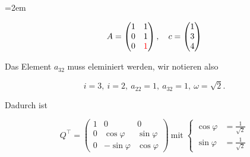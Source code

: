 \begin{solution}    

    \vspace{1\baselineskip}

    \leftskip=2em

    \begin{equation*}
        A = \begin{pmatrix}
            1 & 1\\
            0 & 1\\
            0 & \textcolor{red}{1}
        \end{pmatrix}, \quad
        c = \begin{pmatrix}
            1\\
            3\\
            4
        \end{pmatrix}
    \end{equation*}

    \vspace{1\baselineskip}

    Das Element \( a_{32} \) muss eleminiert werden, wir notieren also
    
    \begin{equation*}
        i = 3, \ i = 2, \ a_{22} = 1, \ a_{32} = 1, \ \omega = \sqrt{2}. 
    \end{equation*}

    Dadurch ist

    \begin{equation*}
        Q^{\top} = \begin{pmatrix}
            1 & 0 & 0\\
            0 & \cos \varphi & \sin \varphi\\
            0 & -\sin \varphi & \cos \varphi
        \end{pmatrix} \ \text{mit} \; \left\{ \begin{aligned}
            \cos \varphi &= \frac{1}{\sqrt{2}}\\
            \sin \varphi &= \frac{1}{\sqrt{2}}
        \end{aligned} \right.
    \end{equation*}

    \vspace{1\baselineskip}


\end{solution}
